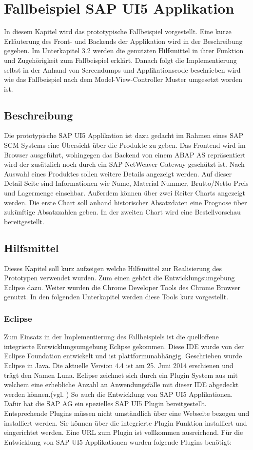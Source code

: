 \section{Fallbeispiel SAP UI5 Applikation}\label{fallbeispiel}
In diesem Kapitel wird das prototypische Fallbeispiel vorgestellt. Eine kurze Erläuterung des Front- und Backends der Applikation wird in der Beschreibung gegeben. Im Unterkapitel 3.2 werden die genutzten Hilfsmittel in ihrer Funktion und Zugehörigkeit zum Fallbeispiel erklärt. Danach folgt die Implementierung selbst in der Anhand von Screendumps und Applikationscode beschrieben wird wie das Fallbeispiel nach dem Model-View-Controller Muster umgesetzt worden ist.

\subsection{Beschreibung}
Die prototypische SAP UI5 Applikation ist dazu gedacht im Rahmen eines SAP SCM Systems eine Übersicht über die Produkte zu geben. Das Frontend wird im Browser ausgeführt, wohingegen das Backend von einem ABAP AS repräsentiert wird der zusätzlich noch durch ein SAP NetWeaver Gateway geschützt ist. Nach Auswahl eines Produktes sollen weitere Details angezeigt werden. Auf dieser Detail Seite sind Informationen wie Name, Material Nummer, Brutto/Netto Preis und Lagermenge einsehbar. Außerdem können über zwei Reiter Charts angezeigt werden. Die erste Chart soll anhand historischer Absatzdaten eine Prognose über zukünftige Absatzzahlen geben. In der zweiten Chart wird eine Bestellvorschau bereitgestellt.

\subsection{Hilfsmittel}
Dieses Kapitel soll kurz aufzeigen welche Hilfsmittel zur Realisierung des Prototypen verwendet wurden. Zum einen gehört die Entwicklungsumgebung Eclipse dazu. Weiter wurden die Chrome Developer Tools des Chrome Browser genutzt. In den folgenden Unterkapitel werden diese Tools kurz vorgestellt.

\subsubsection{Eclipse}
Zum Einsatz in der Implementierung des Fallbeispiels ist die quelloffene integrierte Entwicklungsumgebung Eclipse gekommen. Diese IDE wurde von der Eclipse Foundation entwickelt und ist plattformunabhängig. Geschrieben wurde Eclipse in Java. Die aktuelle Version 4.4 ist am 25. Juni 2014 erschienen und trägt den Namen Luna. Eclipse zeichnet sich durch ein Plugin System aus mit welchem eine erhebliche Anzahl an Anwendungsfälle mit dieser IDE abgedeckt werden können.(vgl. \cite{WikiEclipse2014}) So auch die Entwicklung von SAP UI5 Applikationen. Dafür hat die SAP AG ein spezielles SAP UI5 Plugin bereitgestellt. Entsprechende Plugins müssen nicht umständlich über eine Webseite bezogen und installiert werden. Sie können über die integrierte Plugin Funktion installiert und eingerichtet werden. Eine URL zum Plugin ist vollkommen ausreichend. Für die Entwicklung von SAP UI5 Applikationen wurden folgende Plugins benötigt:
	
